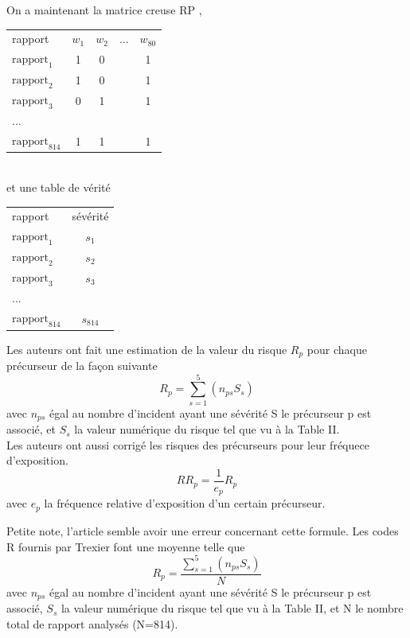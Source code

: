 \begin{frame}
	On a maintenant la matrice creuse RP , \\
	\begin{tabular}[t]{lcccc}
		rapport & $w_1$ & $w_2$ & ... & $w_{80}$ \\
		$\textrm{rapport}_1$ & 1 & 0 &  & 1 \\
		$\textrm{rapport}_2$ & 1 & 0 &  & 1 \\
		$\textrm{rapport}_3$ & 0 & 1 &  & 1 \\
		... &  &  &  & \\
		$\textrm{rapport}_{814}$ & 1 & 1 &  & 1 \\
	\end{tabular}\\ 
	\bigskip
	et une table de vérité \\
	\begin{tabular}[t]{lc}
		rapport & sévérité  \\
		$\textrm{rapport}_1$ & $s_1$ \\
		$\textrm{rapport}_2$ & $s_2$ \\
		$\textrm{rapport}_3$ & $s_3$ \\
		... &  \\
		$\textrm{rapport}_{814}$ & $s_{814}$ \\
	\end{tabular}
\end{frame}

\begin{frame}
	Les auteurs ont fait une estimation de la valeur du risque $R_p$ pour chaque précurseur de la façon suivante\\
	$$R_p = \sum_{s=1}^{5} (n_{ps}S_s) $$
	avec $n_{ps}$ égal au nombre d'incident ayant une sévérité S le précurseur p est associé, et $S_s$ la valeur numérique du risque tel que vu à la Table II.\\
	\bigskip
	Les auteurs ont aussi corrigé les risques des précurseurs pour leur fréquece d'exposition.
	$$RR_p = \frac{1}{e_p} R_p$$
	avec $e_p$ la fréquence relative d'exposition d'un certain précurseur.
\end{frame}

\begin{frame}
	Petite note, l'article semble avoir une erreur concernant cette formule. Les codes R fournis par Trexier font une moyenne telle que 
	$$R_p = \frac{\sum_{s=1}^{5} (n_{ps}S_s)}{N}  $$
	avec $n_{ps}$ égal au nombre d'incident ayant une sévérité S le précurseur p est associé, $S_s$ la valeur numérique du risque tel que vu à la Table II, et N le nombre total de rapport analysés (N=814).\\
\end{frame}

